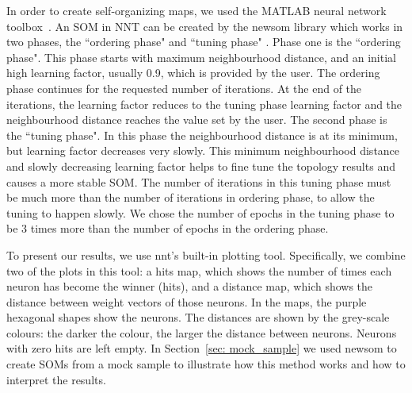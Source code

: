      In order to create self-organizing maps, we used the {\sc MATLAB} neural network toolbox~\citep[NNT,][]{matlabtolbox}.
     An SOM in {\sc NNT} can be created by the {\sc newsom} library which works in two phases, the ``ordering phase" and ``tuning phase" . 
     Phase one is the ``ordering phase". 
     This phase starts with maximum neighbourhood distance, and an initial high learning factor, usually 0.9, which is provided by the user. 
     The ordering phase continues for the requested number of iterations.
     At the end of the iterations, the learning factor reduces to the tuning phase learning factor and the neighbourhood distance reaches the value set by the user. 
     The second phase is the ``tuning phase".
     In this phase the neighbourhood distance is at its minimum, but learning factor decreases very slowly.
     This minimum neighbourhood distance and slowly decreasing learning factor helps to fine tune the topology results and causes a more stable SOM. 
     The number of iterations in this tuning phase must be much more than the number of iterations in ordering phase, to allow the tuning to happen slowly. 
     We chose the number of epochs in the tuning phase to be 3 times more than the number of epochs in the ordering phase.
     
     To present our results, we use {\sc nnt}'s built-in plotting tool.
     Specifically, we combine two of the plots in this tool: a hits map, which shows the number of times each neuron has become the winner (hits), and a distance map, which shows the distance between weight vectors of those neurons.
     In the maps, the purple hexagonal shapes show the neurons. 
     The distances are shown by the grey-scale colours: the darker the colour, the larger the distance between neurons.
     Neurons with zero hits are left empty.
     In Section~\ref{sec: mock_sample} we used {\sc newsom} to create SOMs from a mock sample to illustrate how this method works and how to interpret the results.

